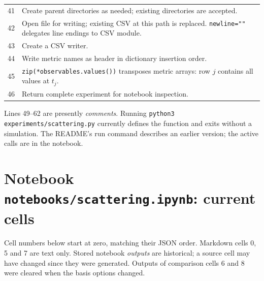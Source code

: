 \documentclass[11pt,a4paper]{article}
\newcommand{\code}[1]{\nolinkurl{#1}}
\begin{document}
\begin{longtable}{p{}p{}}
41 & Create parent directories as needed; existing directories are accepted.\\
42 & Open file for writing; existing CSV at this path is replaced. \code{newline=""} delegates line endings to CSV module.\\
43 & Create a CSV writer.\\
44 & Write metric names as header in dictionary insertion order.\\
45 & \code{zip(*observables.values())} transposes metric arrays: row $j$ contains all values at $t_j$.\\
46 & Return complete experiment for notebook inspection.\\
\bottomrule
\end{longtable}
Lines 49--62 are presently \emph{comments}. Running
\code{python3 experiments/scattering.py} currently defines the function and
exits without a simulation. The README's run command describes an earlier
version; the active calls are in the notebook.

\section{Notebook \code{notebooks/scattering.ipynb}: current cells}
Cell numbers below start at zero, matching their JSON order. Markdown cells
0, 5 and 7 are text only. Stored notebook \emph{outputs} are historical; a
source cell may have changed since they were generated. Outputs of comparison
cells 6 and 8 were cleared when the basis options changed.
\end{document}
